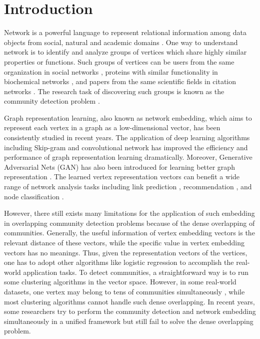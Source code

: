 \documentclass[sigconf]{acmart}
\begin{document}




\maketitle

\section{Introduction}

Network is a powerful language to represent relational information among data objects from social, natural and academic domains \cite{yang2014detecting}.
One way to understand network is to identify and analyze groups of vertices which share highly similar properties or functions.
Such groups of vertices can be users from the same organization in social networks \cite{newman2004detecting}, proteins with similar functionality in biochemical networks \cite{krogan2006global}, and papers from the same scientific fields in citation networks \cite{ruan2013efficient}.
The research task of discovering such groups is known as the community detection problem \cite{Zhang2015PNMF}.

Graph representation learning, also known as network embedding, which aims to represent each vertex in a graph as a low-dimensional vector, has been consistently studied in recent years.
The application of deep learning algorithms including Skip-gram \cite{deepwalk,node2vec} and convolutional network \cite{gcn} has improved the efficiency and performance of graph representation learning dramatically.
Moreover, Generative Adversarial Nets (GAN) has also been introduced for learning better graph representation \cite{GraphGAN}.
The learned vertex representation vectors can benefit a wide range of network analysis tasks including link prediction \cite{gao2011temporal,wang2018shine}, recommendation \cite{yu2014personalized,doi:10.1137/1.9781611974973.43}, and node classification \cite{tang2016node}.

However, there still exists many limitations for the application of such embedding in overlapping community detection problems because of the dense overlapping of communities.
Generally, the useful information of vertex embedding vectors is the relevant distance of these vectors, while the specific value in vertex embedding vectors has no meanings.
Thus, given the representation vectors of the vertices, one has to adopt other algorithms like logistic regression to accomplish the real-world application tasks.
To detect communities, a straightforward way is to run some clustering algorithms in the vector space.
However, in some real-world datasets, one vertex may belong to tens of communities simultaneously \cite{DBLP:journals/corr/abs-1110-5813,yang2012community}, while most clustering algorithms cannot handle such dense overlapping.
In recent years, some researchers try to perform the community detection and network embedding simultaneously in a unified framework \cite{M-NMF,ComE} but still fail to solve the dense overlapping problem.
\end{document}
